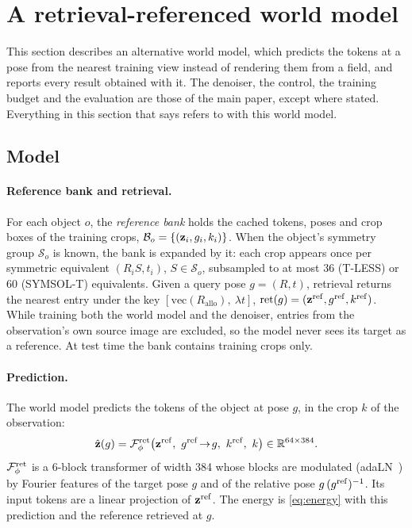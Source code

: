 \section{A retrieval-referenced world model}
\label{sec:supp-ret}

This section describes an alternative world model, which predicts the tokens at a pose from the nearest training view instead of
rendering them from a field, and reports every result obtained with it. The denoiser, the control, the training budget and the
evaluation are those of the main paper, except where stated. Everything in this section that says \method refers to \method with this
world model.

\subsection{Model}
\label{sec:supp-ret-model}

\paragraph{Reference bank and retrieval.}
For each object $o$, the \emph{reference bank} holds the cached tokens, poses and crop boxes of the training crops,
$\mathcal{B}_o=\{(\mathbf{z}_i,g_i,k_i)\}$. When the object's symmetry group $\mathcal{S}_o$ is known, the bank is expanded by it: each crop
appears once per symmetric equivalent $(R_iS,t_i)$, $S\in\mathcal{S}_o$, subsampled to at most 36 (T-LESS) or 60 (SYMSOL-T) equivalents. Given a
query pose $g=(R,t)$, retrieval returns the nearest entry under the key $[\mathrm{vec}(R_{\text{allo}}),\ \lambda t]$,
$\mathrm{ret}(g)=(\mathbf{z}^{\mathrm{ref}},g^{\mathrm{ref}},k^{\mathrm{ref}})$. While training both the world model and the denoiser, entries from the observation's own
source image are excluded, so the model never sees its target as a reference. At test time the bank contains training crops only.

\paragraph{Prediction.}
The world model predicts the tokens of the object at pose $g$, in the crop $k$ of the observation:
\begin{equation}
\zhat(g) = \WM^{\mathrm{ret}}\big(\zref,\ \gref \!\rightarrow\! g,\ k^{\mathrm{ref}},\ k\big)\in\mathbb{R}^{64\times384}.
\label{eq:retwm}
\end{equation}
$\mathcal{F}_\phi^{\mathrm{ret}}$ is a 6-block transformer of width 384 whose blocks are modulated (adaLN~\cite{peebles2023dit}) by Fourier features
of the target pose $g$ and of the relative pose $g\,(g^{\mathrm{ref}})^{-1}$. Its input tokens are a linear projection of $\mathbf{z}^{\mathrm{ref}}$. The energy is
\cref{eq:energy} with this prediction and the reference retrieved at $g$.

